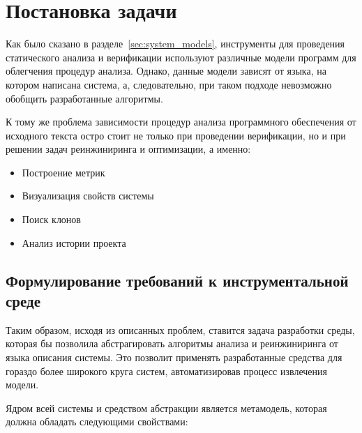 \chapter{Постановка задачи}
\label{sec:task}
Как было сказано в разделе~\ref{sec:system_models}, инструменты для проведения
статического анализа и верификации используют различные модели программ для
облегчения процедур анализа. Однако, данные модели зависят от языка, на котором
написана система, а, следовательно, при таком подходе невозможно обобщить
разработанные алгоритмы.

К тому же проблема зависимости процедур анализа программного обеспечения от
исходного текста остро стоит не только при проведении верификации, но и при
решении задач реинжиниринга и оптимизации, а именно:

\begin{itemize}
    \item Построение метрик
    \item Визуализация свойств системы
    \item Поиск клонов
    \item Анализ истории проекта
\end{itemize}

\section{Формулирование требований к инструментальной среде}

Таким образом, исходя из описанных проблем, ставится задача разработки среды,
которая бы позволила абстрагировать алгоритмы анализа и реинжиниринга от языка
описания системы. Это позволит применять разработанные средства для гораздо
более широкого круга систем, автоматизировав процесс извлечения модели.

Ядром всей системы и средством абстракции является метамодель, которая должна
обладать следующими свойствами:


